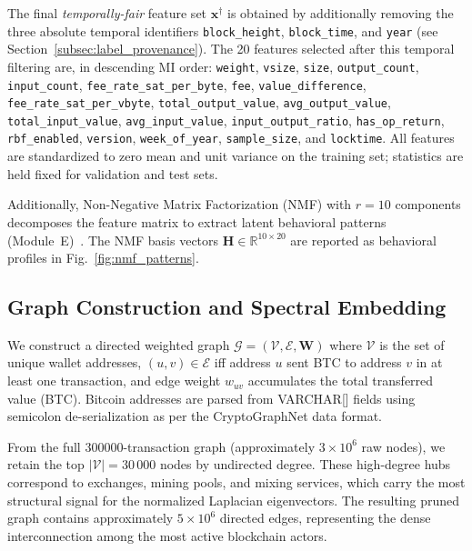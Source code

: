 \documentclass[journal]{IEEEtran}
\begin{document}
The final \emph{temporally-fair} feature set $\mathbf{x}^{\dagger}$
is obtained by additionally removing the three absolute temporal identifiers
\texttt{block\_height}, \texttt{block\_time}, and \texttt{year}
(see Section~\ref{subsec:label_provenance}).
The 20 features selected after this temporal filtering are, in descending
MI order: \texttt{weight}, \texttt{vsize}, \texttt{size}, \texttt{output\_count},
\texttt{input\_count}, \texttt{fee\_rate\_sat\_per\_byte}, \texttt{fee},
\texttt{value\_difference}, \texttt{fee\_rate\_sat\_per\_vbyte},
\texttt{total\_output\_value}, \texttt{avg\_output\_value},
\texttt{total\_input\_value}, \texttt{avg\_input\_value},
\texttt{input\_output\_ratio}, \texttt{has\_op\_return}, \texttt{rbf\_enabled},
\texttt{version}, \texttt{week\_of\_year}, \texttt{sample\_size},
and \texttt{locktime}.
All features are standardized to zero mean and unit variance on the training
set; statistics are held fixed for validation and test sets.

Additionally, Non-Negative Matrix Factorization (NMF) with $r = 10$ components
decomposes the feature matrix to extract latent behavioral patterns
(Module~E)~\cite{Lee1999}.
The NMF basis vectors $\mathbf{H} \in \mathbb{R}^{10 \times 20}$ are reported
as behavioral profiles in Fig.~\ref{fig:nmf_patterns}.


\subsection{Graph Construction and Spectral Embedding}
\label{subsec:graph}

We construct a directed weighted graph
$\mathcal{G} = (\mathcal{V}, \mathcal{E}, \mathbf{W})$
where $\mathcal{V}$ is the set of unique wallet addresses,
$(u, v) \in \mathcal{E}$ iff address $u$ sent BTC to address $v$ in at
least one transaction, and edge weight $w_{uv}$ accumulates the total
transferred value (BTC).
Bitcoin addresses are parsed from VARCHAR[] fields using semicolon
de-serialization as per the CryptoGraphNet data format.

From the full \num{300000}-transaction graph (approximately $3 \times 10^6$
raw nodes), we retain the top $|\mathcal{V}| = 30\,000$ nodes by
undirected degree.
These high-degree hubs correspond to exchanges, mining pools, and mixing
services, which carry the most structural signal for the normalized
Laplacian eigenvectors.
The resulting pruned graph contains approximately $5 \times 10^6$ directed
edges, representing the dense interconnection among the most active
blockchain actors.
\end{document}
